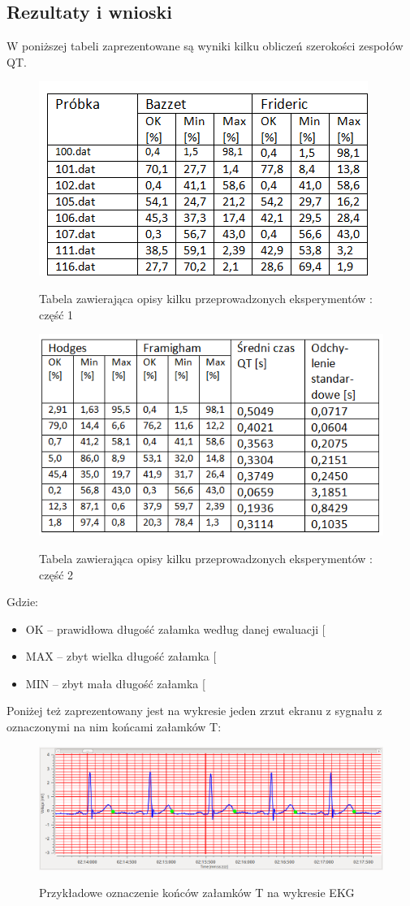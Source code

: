 \subsection{Rezultaty i wnioski}

W poniższej tabeli zaprezentowane są wyniki kilku obliczeń szerokości zespołów QT. 
\begin{figure}[H]
\centering
\includegraphics[scale=1.0]{QT_DISP/img/031}
\label{fig:Tabela1}
\caption{Tabela zawierająca opisy kilku przeprowadzonych eksperymentów : część 1}
\end{figure}

\begin{figure}[H]
\centering
\includegraphics[scale=1.0]{QT_DISP/img/032}
\label{fig:Tabela2}
\caption{Tabela zawierająca opisy kilku przeprowadzonych eksperymentów : część 2}
\end{figure}

Gdzie: 

\begin{itemize}
  \item OK – prawidłowa długość załamka według danej ewaluacji [%
  \item MAX – zbyt wielka długość załamka [%
  \item MIN – zbyt mała długość załamka [%
\end{itemize}

Poniżej też zaprezentowany jest na wykresie jeden zrzut ekranu z sygnału z oznaczonymi na nim końcami załamków T:
\begin{figure}[H]
\centering
\includegraphics[scale=1.0]{QT_DISP/img/04}
\label{fig:Wykres1}
\caption{Przykładowe oznaczenie końców załamków T na wykresie EKG}
\end{figure}
